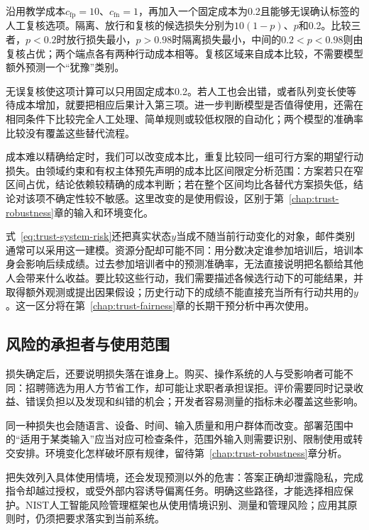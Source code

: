 \begin{example}[增加复核选项后的决策]
\label{ex:trust-review-cost}
沿用教学成本$c_{\mathrm{fp}}=10$、$c_{\mathrm{fn}}=1$，再加入一个固定成本为0.2且能够无误确认标签的人工复核选项。隔离、放行和复核的候选损失分别为$10(1-p)$、$p$和0.2。比较三者，$p<0.2$时放行损失最小，$p>0.98$时隔离损失最小，中间的$0.2<p<0.98$则由复核占优；两个端点各有两种行动成本相等。复核区域来自成本比较，不需要模型额外预测一个“犹豫”类别。
\end{example}

无误复核使这项计算可以只用固定成本0.2。若人工也会出错，或者队列变长使等待成本增加，就要把相应后果计入第三项。进一步判断模型是否值得使用，还需在相同条件下比较完全人工处理、简单规则或较低权限的自动化；两个模型的准确率比较没有覆盖这些替代流程。

成本难以精确给定时，我们可以改变成本比，重复比较同一组可行方案的期望行动损失。由领域约束和有权主体预先声明的成本比区间限定分析范围：方案若只在窄区间占优，结论依赖较精确的成本判断；若在整个区间均比各替代方案损失低，结论对该项不确定性较不敏感。这里改变的是使用假设，区别于第~\ref{chap:trust-robustness}章的输入和环境变化。

式~\eqref{eq:trust-system-risk}还把真实状态$y$当成不随当前行动变化的对象，邮件类别通常可以采用这一建模。资源分配却可能不同：用分数决定谁参加培训后，培训本身会影响后续成绩。过去参加培训者中的预测准确率，无法直接说明把名额给其他人会带来什么收益。要比较这些行动，我们需要描述各候选行动下的可能结果，并取得额外观测或提出因果假设；历史行动下的成绩不能直接充当所有行动共用的$y$。这一区分将在第~\ref{chap:trust-fairness}章的长期干预分析中再次使用。

\subsection{风险的承担者与使用范围}

损失确定后，还要说明损失落在谁身上。购买、操作系统的人与受影响者可能不同：招聘筛选为用人方节省工作，却可能让求职者承担误拒。评价需要同时记录收益、错误负担以及发现和纠错的机会；开发者容易测量的指标未必覆盖这些影响。

同一种损失也会随语言、设备、时间、输入质量和用户群体而改变。部署范围中的“适用于某类输入”应当对应可检查条件，范围外输入则需要识别、限制使用或转交安排。环境变化怎样破坏原有规律，留待第~\ref{chap:trust-robustness}章分析。

把失效列入具体使用情境，还会发现预测以外的危害：答案正确却泄露隐私，完成指令却越过授权，或受外部内容诱导偏离任务。明确这些路径，才能选择相应保护。NIST人工智能风险管理框架也从使用情境识别、测量和管理风险；应用其原则时，仍须把要求落实到当前系统。

